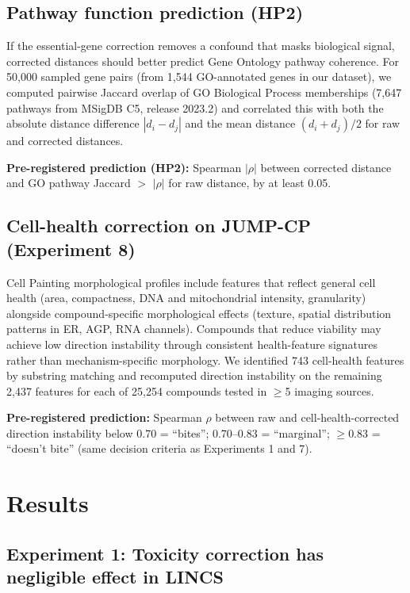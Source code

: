 \documentclass{article}
\begin{document}
\subsection{Pathway function prediction (HP2)}

If the essential-gene correction removes a confound that masks biological
signal, corrected distances should better predict Gene Ontology pathway
coherence. For 50{,}000 sampled gene pairs (from 1{,}544 GO-annotated genes
in our dataset), we computed pairwise Jaccard overlap of GO Biological
Process memberships (7{,}647 pathways from MSigDB C5, release 2023.2) and
correlated this with both the absolute distance difference $|d_i - d_j|$
and the mean distance $(d_i + d_j)/2$ for raw and corrected distances.

\textbf{Pre-registered prediction (HP2):} Spearman $|\rho|$ between corrected
distance and GO pathway Jaccard $>$ $|\rho|$ for raw distance, by at least
0.05.

\subsection{Cell-health correction on JUMP-CP (Experiment 8)}

Cell Painting morphological profiles include features that reflect general
cell health (area, compactness, DNA and mitochondrial intensity, granularity)
alongside compound-specific morphological effects (texture, spatial
distribution patterns in ER, AGP, RNA channels). Compounds that reduce
viability may achieve low direction instability through consistent
health-feature signatures rather than mechanism-specific morphology. We
identified 743 cell-health features by substring matching and recomputed
direction instability on the remaining 2{,}437 features for each of 25{,}254
compounds tested in $\geq$5 imaging sources.

\textbf{Pre-registered prediction:} Spearman $\rho$ between raw and
cell-health-corrected direction instability below 0.70 = ``bites'';
0.70--0.83 = ``marginal''; $\geq 0.83$ = ``doesn't bite'' (same decision
criteria as Experiments 1 and 7).

\section{Results}

\subsection{Experiment 1: Toxicity correction has negligible effect in LINCS}
\end{document}
